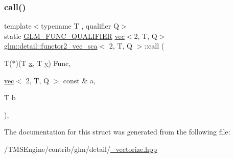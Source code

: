 \subsubsection{\texorpdfstring{call()}{call()}}
{\footnotesize\ttfamily template$<$typename T , qualifier Q$>$ \\
static \hyperlink{setup_8hpp_a33fdea6f91c5f834105f7415e2a64407}{G\+L\+M\+\_\+\+F\+U\+N\+C\+\_\+\+Q\+U\+A\+L\+I\+F\+I\+ER} \hyperlink{structglm_1_1vec}{vec}$<$2, T, Q$>$ \hyperlink{structglm_1_1detail_1_1functor2__vec__sca}{glm\+::detail\+::functor2\+\_\+vec\+\_\+sca}$<$ 2, T, Q $>$\+::call (\begin{DoxyParamCaption}\item[{T($\ast$)(T \hyperlink{_s_d_l__opengl_8h_ad0e63d0edcdbd3d79554076bf309fd47}{x}, T \hyperlink{_s_d_l__opengl_8h_a1675d9d7bb68e1657ff028643b4037e3}{y})}]{Func,  }\item[{\hyperlink{structglm_1_1vec}{vec}$<$ 2, T, Q $>$ const \&}]{a,  }\item[{T}]{b }\end{DoxyParamCaption})\hspace{0.3cm}{\ttfamily [inline]}, {\ttfamily [static]}}



The documentation for this struct was generated from the following file\+:\begin{DoxyCompactItemize}
\item 
/\+T\+M\+S\+Engine/contrib/glm/detail/\hyperlink{__vectorize_8hpp}{\+\_\+vectorize.\+hpp}\end{DoxyCompactItemize}
